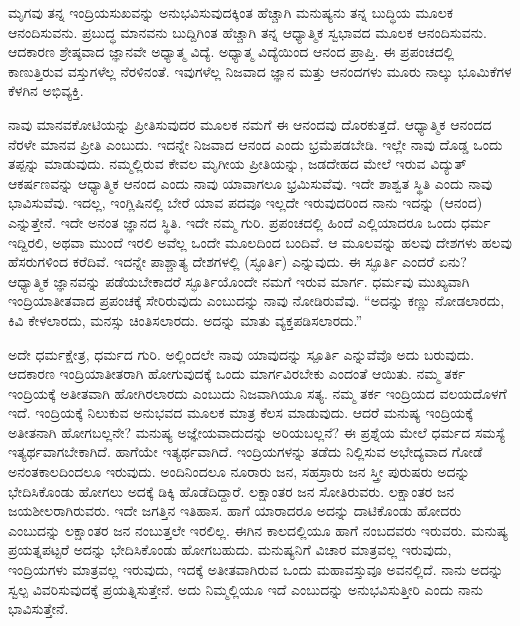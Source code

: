 ಮೃಗವು ತನ್ನ ಇಂದ್ರಿಯಸುಖವನ್ನು ಅನುಭವಿಸುವುದಕ್ಕಿಂತ ಹೆಚ್ಚಾಗಿ ಮನುಷ್ಯನು ತನ್ನ ಬುದ್ಧಿಯ ಮೂಲಕ ಆನಂದಿಸುವನು. ಪ್ರಬುದ್ಧ ಮಾನವನು ಬುದ್ದಿಗಿಂತ ಹೆಚ್ಚಾಗಿ ತನ್ನ ಆಧ್ಯಾತ್ಮಿಕ ಸ್ವಭಾವದ ಮೂಲಕ ಆನಂದಿಸುವನು. ಆದಕಾರಣ ಶ್ರೇಷ್ಠವಾದ ಜ್ಞಾನವೇ ಅಧ್ಯಾತ್ಮ ವಿದ್ಯೆ. ಅಧ್ಯಾತ್ಮ ವಿದ್ಯೆಯಿಂದ ಆನಂದ ಪ್ರಾಪ್ತಿ. ಈ ಪ್ರಪಂಚದಲ್ಲಿ ಕಾಣುತ್ತಿರುವ ವಸ್ತುಗಳೆಲ್ಲ ನೆರಳಿನಂತೆ. ಇವುಗಳೆಲ್ಲ ನಿಜವಾದ ಜ್ಞಾನ ಮತ್ತು ಆನಂದಗಳು ಮೂರು ನಾಲ್ಕು ಭೂಮಿಕೆಗಳ ಕೆಳಗಿನ ಅಭಿವ್ಯಕ್ತಿ.

ನಾವು ಮಾನವಕೋಟಿಯನ್ನು ಪ್ರೀತಿಸುವುದರ ಮೂಲಕ ನಮಗೆ ಈ ಆನಂದವು ದೊರಕುತ್ತದೆ. ಆಧ್ಯಾತ್ಮಿಕ ಆನಂದದ ನೆರಳೇ ಮಾನವ ಪ್ರೀತಿ ಎಂಬುದು. ಇದನ್ನೇ ನಿಜವಾದ ಆನಂದ ಎಂದು ಭ್ರಮೆಪಡಬೇಡಿ. ಇಲ್ಲೇ ನಾವು ದೊಡ್ಡ ಒಂದು ತಪ್ಪನ್ನು ಮಾಡುವುದು. ನಮ್ಮಲ್ಲಿರುವ ಕೇವಲ ಮೃಗೀಯ ಪ್ರೀತಿಯನ್ನು, ಜಡದೇಹದ ಮೇಲೆ ಇರುವ ವಿದ್ಯುತ್ ಆಕರ್ಷಣವನ್ನು ಆಧ್ಯಾತ್ಮಿಕ ಆನಂದ ಎಂದು ನಾವು ಯಾವಾಗಲೂ ಭ್ರಮಿಸುವೆವು. ಇದೇ ಶಾಶ್ವತ ಸ್ಥಿತಿ ಎಂದು ನಾವು ಭಾವಿಸುವೆವು. ಇದಲ್ಲ, ಇಂಗ್ಲಿಷಿನಲ್ಲಿ ಬೇರೆ ಯಾವ ಪದವೂ ಇಲ್ಲದೇ ಇರುವುದರಿಂದ ನಾನು ಇದನ್ನು  (ಆನಂದ) ಎನ್ನುತ್ತೇನೆ. ಇದೇ ಅನಂತ ಜ್ಞಾನದ ಸ್ಥಿತಿ. ಇದೇ ನಮ್ಮ ಗುರಿ. ಪ್ರಪಂಚದಲ್ಲಿ ಹಿಂದೆ ಎಲ್ಲಿಯಾದರೂ ಒಂದು ಧರ್ಮ ಇದ್ದಿರಲಿ, ಅಥವಾ ಮುಂದೆ ಇರಲಿ ಅವೆಲ್ಲ ಒಂದೇ ಮೂಲದಿಂದ ಬಂದಿವೆ. ಆ ಮೂಲವನ್ನು ಹಲವು ದೇಶಗಳು ಹಲವು ಹೆಸರುಗಳಿಂದ ಕರೆದಿವೆ. ಇದನ್ನೇ ಪಾಶ್ಚಾತ್ಯ ದೇಶಗಳಲ್ಲಿ  (ಸ್ಫೂರ್ತಿ) ಎನ್ನುವುದು. ಈ ಸ್ಫೂರ್ತಿ ಎಂದರೆ ಏನು? ಆಧ್ಯಾತ್ಮಿಕ ಜ್ಞಾನವನ್ನು ಪಡೆಯಬೇಕಾದರೆ ಸ್ಫೂರ್ತಿಯೊಂದೇ ನಮಗೆ ಇರುವ ಮಾರ್ಗ. ಧರ್ಮವು ಮುಖ್ಯವಾಗಿ ಇಂದ್ರಿಯಾತೀತವಾದ ಪ್ರಪಂಚಕ್ಕೆ ಸೇರಿರುವುದು ಎಂಬುದನ್ನು ನಾವು ನೋಡಿರುವೆವು. “ಅದನ್ನು ಕಣ್ಣು ನೋಡಲಾರದು, ಕಿವಿ ಕೇಳಲಾರದು, ಮನಸ್ಸು ಚಿಂತಿಸಲಾರದು. ಅದನ್ನು ಮಾತು ವ್ಯಕ್ತಪಡಿಸಲಾರದು.”

ಅದೇ ಧರ್ಮಕ್ಷೇತ್ರ, ಧರ್ಮದ ಗುರಿ. ಅಲ್ಲಿಂದಲೇ ನಾವು ಯಾವುದನ್ನು ಸ್ಪೂರ್ತಿ ಎನ್ನುವೆವೊ ಅದು ಬರುವುದು. ಆದಕಾರಣ ಇಂದ್ರಿಯಾತೀತರಾಗಿ ಹೋಗುವುದಕ್ಕೆ ಒಂದು ಮಾರ್ಗವಿರಬೇಕು ಎಂದಂತೆ ಆಯಿತು. ನಮ್ಮ ತರ್ಕ ಇಂದ್ರಿಯಕ್ಕೆ ಅತೀತವಾಗಿ ಹೋಗಿರಲಾರದು ಎಂಬುದು ನಿಜವಾಗಿಯೂ ಸತ್ಯ. ನಮ್ಮ ತರ್ಕ ಇಂದ್ರಿಯದ ವಲಯದೊಳಗೆ ಇದೆ. ಇಂದ್ರಿಯಕ್ಕೆ ನಿಲುಕುವ ಅನುಭವದ ಮೂಲಕ ಮಾತ್ರ ಕೆಲಸ ಮಾಡುವುದು. ಆದರೆ ಮನುಷ್ಯ ಇಂದ್ರಿಯಕ್ಕೆ ಅತೀತನಾಗಿ ಹೋಗಬಲ್ಲನೇ? ಮನುಷ್ಯ ಅಜ್ಞೇಯವಾದುದನ್ನು ಅರಿಯಬಲ್ಲನೆ? ಈ ಪ್ರಶ್ನೆಯ ಮೇಲೆ ಧರ್ಮದ ಸಮಸ್ಯೆ ಇತ್ಯರ್ಥವಾಗಬೇಕಾಗಿದೆ. ಹಾಗೆಯೇ ಇತ್ಯರ್ಥವಾಗಿದೆ. ಇಂದ್ರಿಯಗಳನ್ನು ತಡೆದು ನಿಲ್ಲಿಸುವ ಅಭೇದ್ಯವಾದ ಗೋಡೆ ಅನಂತಕಾಲದಿಂದಲೂ ಇರುವುದು. ಅಂದಿನಿಂದಲೂ ನೂರಾರು ಜನ, ಸಹಸ್ರಾರು ಜನ ಸ್ತ್ರೀ ಪುರುಷರು ಅದನ್ನು ಭೇದಿಸಿಕೊಂಡು ಹೋಗಲು ಅದಕ್ಕೆ ಡಿಕ್ಕಿ ಹೊಡೆದಿದ್ದಾರೆ. ಲಕ್ಷಾಂತರ ಜನ ಸೋತಿರುವರು. ಲಕ್ಷಾಂತರ ಜನ ಜಯಶೀಲರಾಗಿರುವರು. ಇದೇ ಜಗತ್ತಿನ ಇತಿಹಾಸ. ಹಾಗೆ ಯಾರಾದರೂ ಅದನ್ನು ದಾಟಿಕೊಂಡು ಹೋದರು ಎಂಬುದನ್ನು ಲಕ್ಷಾಂತರ ಜನ ನಂಬುತ್ತಲೇ ಇರಲಿಲ್ಲ. ಈಗಿನ ಕಾಲದಲ್ಲಿಯೂ ಹಾಗೆ ನಂಬದವರು ಇರುವರು. ಮನುಷ್ಯ ಪ್ರಯತ್ನಪಟ್ಟರೆ ಅದನ್ನು ಭೇದಿಸಿಕೊಂಡು ಹೋಗಬಹುದು. ಮನುಷ್ಯನಿಗೆ ವಿಚಾರ ಮಾತ್ರವಲ್ಲ ಇರುವುದು, ಇಂದ್ರಿಯಗಳು ಮಾತ್ರವಲ್ಲ ಇರುವುದು, ಇದಕ್ಕೆ ಅತೀತವಾಗಿರುವ ಒಂದು ಮಹಾವಸ್ತುವೂ ಅವನಲ್ಲಿದೆ. ನಾನು ಅದನ್ನು ಸ್ವಲ್ಪ ವಿವರಿಸುವುದಕ್ಕೆ ಪ್ರಯತ್ನಿಸುತ್ತೇನೆ. ಅದು ನಿಮ್ಮಲ್ಲಿಯೂ ಇದೆ ಎಂಬುದನ್ನು ಅನುಭವಿಸುತ್ತೀರಿ ಎಂದು ನಾನು ಭಾವಿಸುತ್ತೇನೆ.


